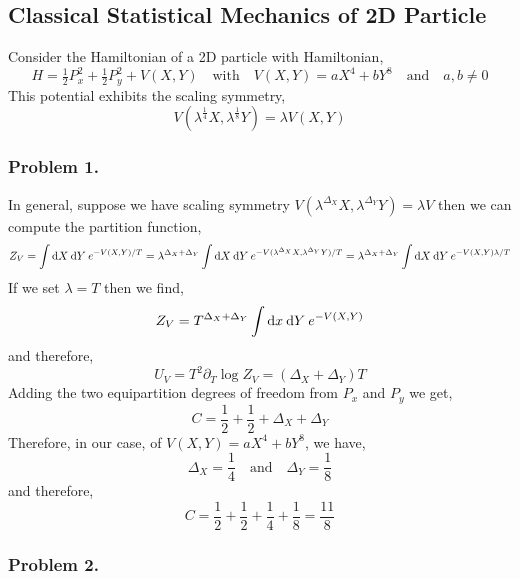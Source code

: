 \documentclass[12pt]{article}
\begin{document}
\subsection{Classical Statistical Mechanics of 2D Particle}

Consider the Hamiltonian of a 2D particle with Hamiltonian,
\[ H = \tfrac{1}{2} P_x^2 + \tfrac{1}{2} P_y^2 + V(X, Y) \quad \text{with} \quad V(X,Y) = a X^4 + b Y^8 \quad \text{and} \quad a,b \neq 0 \]
This potential exhibits the scaling symmetry,
\[ V(\lambda^{\frac{1}{4}} X, \lambda^{\frac{1}{8}} Y) = \lambda V(X, Y) \]

\subsubsection{Problem 1.} 

In general, suppose we have scaling symmetry $V(\lambda^{\Delta_X} X, \lambda^{\Delta_Y} Y) = \lambda V$ then we can compute the partition function,
\begin{align*}
Z_V = \int \mathrm{d}X \: \mathrm{d}Y \: e^{-V(X,Y)/T} = \lambda^{\Delta_X + \Delta_Y} \int \mathrm{d}X \: \mathrm{d}Y \: e^{-V(\lambda^{\Delta_X} X, \lambda^{\Delta_Y} Y)/ T} = \lambda^{\Delta_X + \Delta_Y} \int \mathrm{d}X \: \mathrm{d}Y \: e^{-V(X, Y) \lambda / T}
\end{align*}
If we set $\lambda = T$ then we find,
\begin{align*}
Z_V = T^{\Delta_X + \Delta_Y} \int \mathrm{d}x \: \mathrm{d}Y \: e^{-V(X,Y)}
\end{align*}
and therefore,
\[ U_V = T^2 \partial_T \log{Z_V} = \left( \Delta_X + \Delta_Y \right) T \]
Adding the two equipartition degrees of freedom from $P_x$ and $P_y$ we get,
\[ C = \frac{1}{2} + \frac{1}{2} + \Delta_X + \Delta_Y \]
Therefore, in our case, of $V(X, Y) = a X^4 + b Y^8$, we have,
\[ \Delta_X = \frac{1}{4} \quad \text{and} \quad \Delta_Y = \frac{1}{8} \]
and therefore,
\[ C = \frac{1}{2} + \frac{1}{2} + \frac{1}{4} + \frac{1}{8} = \frac{11}{8} \] 

\subsubsection{Problem 2.} 
\end{document}
